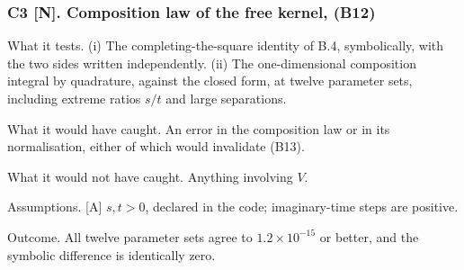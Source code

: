 \documentclass[11pt,a4paper]{article}
\begin{document}
\hypertarget{c3-n.-composition-law-of-the-free-kernel-b12}{%
\subsubsection{C3 {[}N{]}. Composition law of the free kernel, (B12)}\label{c3-n.-composition-law-of-the-free-kernel-b12}}

What it tests. (i) The completing-the-square identity of B.4, symbolically, with the two sides written independently. (ii) The one-dimensional composition integral by quadrature, against the closed form, at twelve parameter sets, including extreme ratios \(s/t\) and large separations.

What it would have caught. An error in the composition law or in its normalisation, either of which would invalidate (B13).

What it would not have caught. Anything involving \(V\).

Assumptions. {[}A{]} \(s,t>0\), declared in the code; imaginary-time steps are positive.

Outcome. All twelve parameter sets agree to \(1.2\times10^{-15}\) or better, and the symbolic difference is identically zero.
\end{document}
